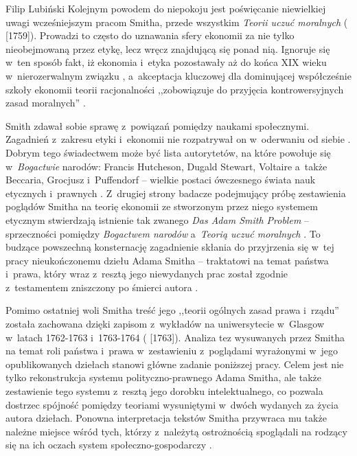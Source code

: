 \begin{artplenv}{Filip Lubiński}
Kolejnym powodem do niepokoju jest poświęcanie niewielkiej uwagi wcześniejszym pracom Smitha, przede wszystkim
\textit{Teorii uczuć moralnych}
(\cite{smith_teoria_1989} [1759]).
Prowadzi to często do uznawania sfery
ekonomii za nie tylko nieobejmowaną przez etykę, lecz wręcz znajdującą się ponad nią. Ignoruje się w~ten sposób fakt,
iż ekonomia i~etyka pozostawały aż do końca XIX wieku w~nierozerwalnym związku
\parencite[s.~235]{rawls_wyklady_2010},
a~akceptacja kluczowej dla dominującej współcześnie szkoły ekonomii teorii racjonalności ,,zobowiązuje do
przyjęcia kontrowersyjnych zasad moralnych''
\parencite[s.~50]{hausman_etyka_2017}.

Smith zdawał sobie sprawę z~powiązań pomiędzy naukami społecznymi. Zagadnień z~zakresu etyki i~ekonomii nie
rozpatrywał on w~oderwaniu od siebie
\parencite[s.~130]{soll_reckoning:_2014}.
Dobrym tego świadectwem może być
lista autorytetów, na które powołuje się w~\textit{Bogactwie }narodów: Francis Hutcheson, Dugald Stewart,
Voltaire a~także Beccaria, Grocjusz i~Puffendorf -- wielkie postaci ówczesnego świata nauk etycznych i~prawnych
\parencite[s.~654]{boorstin_discoverers:_1983}.
Z~drugiej strony badacze podejmujący próbę zestawienia poglądów
Smitha na teorię ekonomii ze stworzonym przez niego systemem etycznym stwierdzają istnienie tak zwanego \textit{Das
Adam Smith Problem} -- sprzeczności pomiędzy \textit{Bogactwem narodów} a~\textit{Teorią uczuć moralnych}
\parencite[s.~215–216]{sedlacek_ekonomia_2012}.
To budzące powszechną konsternację zagadnienie skłania do
przyjrzenia się w~tej pracy nieukończonemu dziełu Adama Smitha -- traktatowi na temat państwa i~prawa, który
wraz z~resztą jego niewydanych prac został zgodnie z~testamentem zniszczony po śmierci autora
\parencite[s.~140]{buchan_adam_2008}.

Pomimo ostatniej woli Smitha treść jego ,,teorii ogólnych zasad prawa i~rządu'' została zachowana dzięki
zapisom z~wykładów na uniwersytecie w~Glasgow w~latach 1762-1763 i~1763-1764
(\cite{smith_lectures_1982} [1763]).
Analiza tez wysuwanych przez Smitha na temat roli państwa i~prawa w~zestawieniu z~poglądami wyrażonymi w~jego
opublikowanych dziełach stanowi główne zadanie poniższej pracy. Celem jest nie tylko rekonstrukcja systemu
polityczno-prawnego Adama Smitha, ale także zestawienie tego systemu z~resztą jego dorobku intelektualnego, co pozwala
dostrzec spójność pomiędzy teoriami wysuniętymi w~dwóch wydanych za życia autora dziełach. Ponowna interpretacja
tekstów Smitha przywraca mu także należne miejsce wśród tych, którzy z~należytą ostrożnością spoglądali na rodzący się
na ich oczach system społeczno-gospodarczy
\parencite[s.~83]{ferguson_wielka_2017}.



\end{artplenv}

